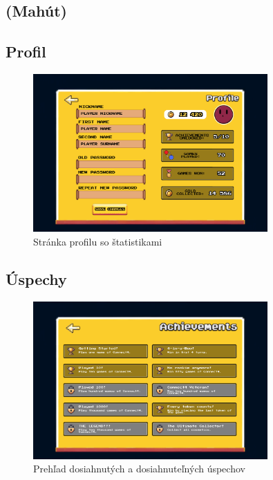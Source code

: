 \documentclass[a4paper, 11pt, onecolumn]{article}
\begin{document}
\subsection{(Mahút)}
\subsection*{Profil}
\begin{figure}[H]
  \centering
  \includegraphics[width=0.8\textwidth]{Profile.png}
  \caption{Stránka profilu so štatistikami}
  \label{fig:profile}
\end{figure}

\subsection*{Úspechy}
\begin{figure}[H]
  \centering
  \includegraphics[width=0.8\textwidth]{Achievements.png}
  \caption{Prehľad dosiahnutých a dosiahnuteľných úspechov}
  \label{fig:achievements}
\end{figure}
\end{document}
